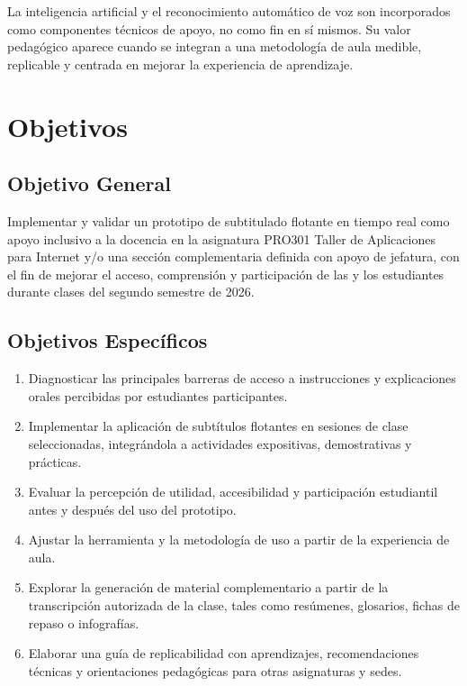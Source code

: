 \documentclass[11pt,letterpaper]{article}
\begin{document}
La inteligencia artificial y el reconocimiento automático de voz son incorporados como componentes técnicos de apoyo, no como fin en sí mismos. Su valor pedagógico aparece cuando se integran a una metodología de aula medible, replicable y centrada en mejorar la experiencia de aprendizaje.

\section{Objetivos}

\subsection{Objetivo General}

Implementar y validar un prototipo de subtitulado flotante en tiempo real como apoyo inclusivo a la docencia en la asignatura PRO301 Taller de Aplicaciones para Internet y/o una sección complementaria definida con apoyo de jefatura, con el fin de mejorar el acceso, comprensión y participación de las y los estudiantes durante clases del segundo semestre de 2026.

\subsection{Objetivos Específicos}

\begin{enumerate}
  \item Diagnosticar las principales barreras de acceso a instrucciones y explicaciones orales percibidas por estudiantes participantes.
  \item Implementar la aplicación de subtítulos flotantes en sesiones de clase seleccionadas, integrándola a actividades expositivas, demostrativas y prácticas.
  \item Evaluar la percepción de utilidad, accesibilidad y participación estudiantil antes y después del uso del prototipo.
  \item Ajustar la herramienta y la metodología de uso a partir de la experiencia de aula.
  \item Explorar la generación de material complementario a partir de la transcripción autorizada de la clase, tales como resúmenes, glosarios, fichas de repaso o infografías.
  \item Elaborar una guía de replicabilidad con aprendizajes, recomendaciones técnicas y orientaciones pedagógicas para otras asignaturas y sedes.
\end{enumerate}
\end{document}
